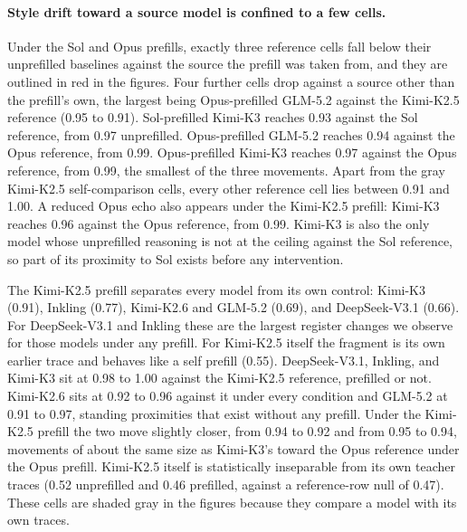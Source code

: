 \paragraph{Style drift toward a source model is confined to a few cells.}
Under the Sol and Opus prefills, exactly three reference cells fall below their unprefilled baselines against the source the prefill was taken from, and they are outlined in red in the figures. Four further cells drop against a source other than the prefill's own, the largest being Opus-prefilled GLM-5.2 against the Kimi-K2.5 reference (0.95 to 0.91). Sol-prefilled Kimi-K3 reaches 0.93 against the Sol reference, from 0.97 unprefilled. Opus-prefilled GLM-5.2 reaches 0.94 against the Opus reference, from 0.99. Opus-prefilled Kimi-K3 reaches 0.97 against the Opus reference, from 0.99, the smallest of the three movements. Apart from the gray Kimi-K2.5 self-comparison cells, every other reference cell lies between 0.91 and 1.00. A reduced Opus echo also appears under the Kimi-K2.5 prefill: Kimi-K3 reaches 0.96 against the Opus reference, from 0.99. Kimi-K3 is also the only model whose unprefilled reasoning is not at the ceiling against the Sol reference, so part of its proximity to Sol exists before any intervention.

The Kimi-K2.5 prefill separates every model from its own control: Kimi-K3 (0.91), Inkling (0.77), Kimi-K2.6 and GLM-5.2 (0.69), and DeepSeek-V3.1 (0.66). For DeepSeek-V3.1 and Inkling these are the largest register changes we observe for those models under any prefill. For Kimi-K2.5 itself the fragment is its own earlier trace and behaves like a self prefill (0.55). DeepSeek-V3.1, Inkling, and Kimi-K3 sit at 0.98 to 1.00 against the Kimi-K2.5 reference, prefilled or not. Kimi-K2.6 sits at 0.92 to 0.96 against it under every condition and GLM-5.2 at 0.91 to 0.97, standing proximities that exist without any prefill. Under the Kimi-K2.5 prefill the two move slightly closer, from 0.94 to 0.92 and from 0.95 to 0.94, movements of about the same size as Kimi-K3's toward the Opus reference under the Opus prefill. Kimi-K2.5 itself is statistically inseparable from its own teacher traces (0.52 unprefilled and 0.46 prefilled, against a reference-row null of 0.47). These cells are shaded gray in the figures because they compare a model with its own traces.


